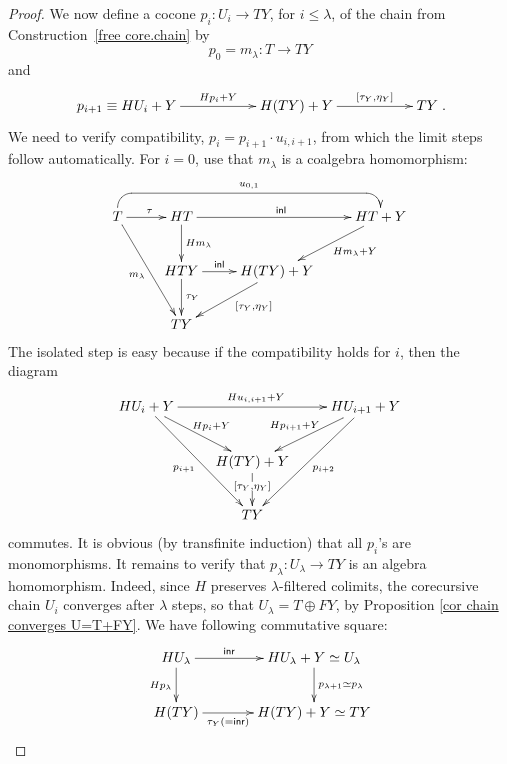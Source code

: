 \documentclass{LMCS}
\theoremstyle{plain}
\theoremstyle{definition}
\numberwithin{equation}{section}
\begin{document}
\begin{proof}
We now define a cocone $p_i: U_i\rightarrow TY$, for $i\leq\lambda$, of
the chain from Construction~\ref{free core.chain} by
$$p_0=m_\lambda:T\rightarrow TY$$
and
$$\xymatrix{p_{i+1}\equiv HU_i+Y\ar[rr]^-{Hp_i+Y}&& H(TY)+Y\ar[rr]^-{[\tau_Y,\eta_Y]}&&TY}.$$
We need to verify compatibility, $p_i=p_{i+1}\cdot u_{i,i+1}$, from which the limit steps follow automatically. For $i=0$, use that $m_\lambda$ is a coalgebra homomorphism:
$$
\xymatrix{
T\ar[r]^\tau\ar[rdd]_{m_\lambda}&HT\ar[rr]^{\mathsf{inl}}\ar[d]^-{Hm_\lambda}&&HT+Y\ar[ld]^(.4)*+{\labelstyle Hm_\lambda+Y}\ar@{<-}`u[l]`[lll]_-{u_{0,1}}[lll]\\
&HTY\ar[r]^-{\mathsf{inl}}\ar[d]^-{\tau_Y}&H(TY)+Y\ar[ld]^(.4)*+{\labelstyle [\tau_Y,\eta_Y]}\\
&TY
}
$$
The isolated  step is easy because if the compatibility holds for $i$, then the diagram
$$
\xymatrix{
HU_i+Y\ar[rr]^{Hu_{i,i+1}+Y}\ar[rd]^{Hp_i+Y}\ar[rdd]_{p_{i+1}}&&HU_{i+1}+Y\ar[ld]_{Hp_{i+1}+Y}\ar[ddl]^{p_{i+2}}\\
&H(TY)+Y\ar[d]|(.45){[\tau_Y,\eta_Y]}\\
&TY
}
$$
commutes. It is obvious (by transfinite induction) that all $p_i$'s
are monomorphisms. It remains to verify that
$p_\lambda:U_\lambda\rightarrow TY$ is an algebra
homomorphism. Indeed, since $H$ preserves $\lambda$-filtered colimits,
the corecursive chain $U_i$ converges after $\lambda$ steps, so that $U_\lambda = T\oplus FY$, by Proposition \ref{cor chain converges U=T+FY}. We have following commutative square:
$$
\xymatrix@C+1pc{
HU_\lambda\ar[r]^-{\mathsf{inr}}\ar[d]_{Hp_\lambda}&HU_\lambda+Y\simeq U_\lambda\ar[d]^{{p_{\lambda+1}}\simeq p_\lambda}\\
H(TY)\ar[r]_-{\tau_Y(=\mathsf{inr})}&H(TY)+Y\simeq TY 
}
$$

\vspace*{-20pt}
\end{proof}
\end{document}
